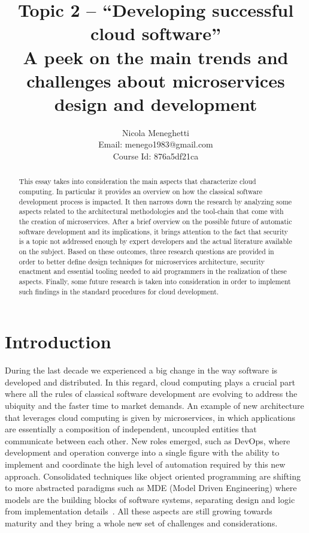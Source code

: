 \documentclass[a4paper, 10pt, conference]{ieeeconf}
\title{Topic 2 -- ``Developing successful cloud software'' \\
\large{A peek on the main trends and challenges about microservices design and development}} %
\author{Nicola Meneghetti \\
	Email: menego1983@gmail.com \\ 
	Course Id: 876a5df21ca
}
\begin{document}
\maketitle
\thispagestyle{empty}
\pagestyle{empty}

\begin{abstract}

This essay takes into consideration the main aspects that characterize cloud computing. In particular it provides an overview on how the classical software development process is impacted. It then narrows down the research by analyzing some aspects related to the architectural methodologies and the tool-chain that come with the creation of microservices. After a brief overview on the possible future of automatic software development and its implications, it brings attention to the fact that security is a topic not addressed enough by expert developers and the actual literature available on the subject. Based on these outcomes, three research questions are provided in order to better define design techniques for microservices architecture, security enactment and essential tooling needed to aid programmers in the realization of these aspects.
Finally, some future research is taken into consideration in order to implement such findings in the standard procedures for cloud development.

\end{abstract}

\section{Introduction}

During the last decade we experienced a big change in the way software is developed and distributed. In this regard, cloud computing plays a crucial part where all the rules of classical software development are evolving to address the ubiquity and the faster time to market demands. An example of new architecture that leverages cloud computing is given by microservices, in which applications are essentially a composition of independent, uncoupled entities that communicate between each other\cite{s-newman}. New roles emerged, such as DevOps, where development and operation converge into a single figure with the ability to implement and coordinate the high level of automation required by this new approach. Consolidated techniques like object oriented programming are shifting to more abstracted paradigms such as MDE (Model Driven Engineering) where models are the building blocks of software systems, separating design and logic from implementation details~\cite{overview-platforms, fuggetta2014software}. All these aspects are still growing towards maturity and they bring a whole new set of challenges and considerations.
\end{document}
